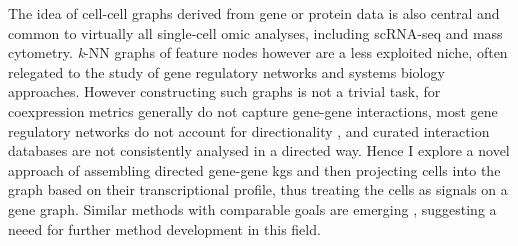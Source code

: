 The idea of cell-cell graphs derived from gene or protein data is also central and common to virtually all single-cell omic analyses, including scRNA-seq and mass cytometry. \emph{k}-NN graphs of feature nodes however are a less exploited niche, often relegated to the study of gene regulatory networks and systems biology approaches. However constructing such graphs is not a trivial task, for coexpression metrics generally do not capture gene-gene interactions, most gene regulatory networks do not account for directionality \cite{chen_inferring_2019}, and curated interaction databases \cite{turei_integrated_2021} are not consistently analysed in a directed way. Hence I explore a novel approach of assembling directed gene-gene \acrfull{kg}s and then projecting cells into the graph based on their transcriptional profile, thus treating the cells as signals on a gene graph. Similar methods with comparable goals are emerging \cite{lefebvre_large-scale_2021}, suggesting a neeed for further method development in this field.


    
    
